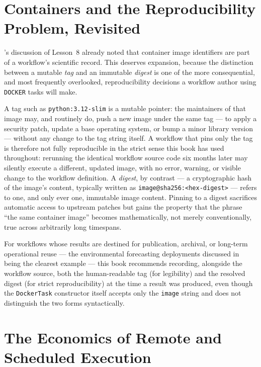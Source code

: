 \section{Containers and the Reproducibility Problem, Revisited}

's discussion of Lesson~8 already noted that container
image identifiers are part of a workflow's scientific record. This deserves
expansion, because the distinction between a mutable \emph{tag} and an
immutable \emph{digest} is one of the more consequential, and most
frequently overlooked, reproducibility decisions a workflow author using
\texttt{DOCKER} tasks will make.

A tag such as \texttt{python:3.12-slim} is a mutable pointer: the
maintainers of that image may, and routinely do, push a new image under the
same tag --- to apply a security patch, update a base operating system, or
bump a minor library version --- without any change to the tag string
itself. A workflow that pins only the tag is therefore not fully
reproducible in the strict sense this book has used throughout: rerunning
the identical workflow source code six months later may silently execute a
different, updated image, with no error, warning, or visible change to the
workflow definition. A \emph{digest}, by contrast --- a cryptographic hash
of the image's content, typically written as
\texttt{image@sha256:<hex-digest>} --- refers to one, and only ever one,
immutable image content. Pinning to a digest sacrifices automatic access to
upstream patches but gains the property that the phrase ``the same
container image'' becomes mathematically, not merely conventionally, true
across arbitrarily long timespans.

\begin{practicebox}
For workflows whose results are destined for publication, archival, or
long-term operational reuse --- the environmental forecasting deployments
discussed in  being the clearest example --- this book
recommends recording, alongside the workflow source, both the human-readable
tag (for legibility) and the resolved digest (for strict reproducibility) at
the time a result was produced, even though the \texttt{DockerTask}
constructor itself accepts only the \texttt{image} string and does not
distinguish the two forms syntactically.
\end{practicebox}

\section{The Economics of Remote and Scheduled Execution}

